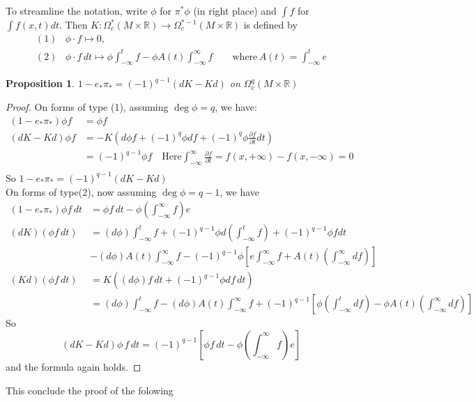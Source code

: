\documentclass{article}
\newtheorem{proposition}{Proposition}[section]
\begin{document}
\qquad To streamline the notation, write  $ \phi $ for  $ \pi^*\phi $ (in right place) and  $ \int f  $ for  $ \int f(x,t)dt $. Then  $ K:\Omega_c^*(M\times \mathbb{R })\rightarrow \Omega_c^{*-1}(M\times \mathbb{R })  $ is defined by
\begin{align*}
    (1)&\phi\cdot f\mapsto 0,\\
    (2)&\phi\cdot f\, dt\mapsto\phi \int_{-\infty}^{t}f-\phi A(t)\int_{-\infty}^{\infty}f\qquad \text{where}\, A(t)=\int_{-\infty}^{t }e
\end{align*}   
\setcounter{proposition}{5}
\begin{proposition}
     $ 1-e_*\pi_*=(-1)^{q-1}(dK-Kd) $ on  $ \Omega_c^q(M\times \mathbb{R }) $  
\end{proposition}
\begin{proof}
    On forms of type (1), assuming  $ \deg \phi =q $, we have:
    \begin{align*}
        (1-e_*\pi_*)\phi f&=\phi f\\
        (dK-Kd)\phi f&=-K(d\phi f+(-1)^q\phi df+(-1)^q\phi \frac{\partial f }{\partial t }dt)\\
        &=(-1)^{q-1}\phi f\quad\text{Here} \int_{-\infty}^{\infty}\frac{\partial f }{\partial t }=f(x,+\infty)-f(x,-\infty)=0\\
    \end{align*}  
    So  $ 1-e_*\pi_*=(-1)^{q-1}(dK-Kd) $\\
    \qquad On forms of type(2), now assuming  $ \deg\phi =q-1 $, we have
    \begin{align*}
        (1-e_*\pi_*)\phi f\, dt&=\phi f \,dt-\phi(\int_{-\infty}^{\infty}f)e\\
        (dK)(\phi f\, dt)&=(d\phi)\int_{-\infty}^{t }f+(-1)^{q-1}\phi d(\int_{-\infty}^{t}f)+(-1)^{q-1}\phi f dt\\
        &-(d\phi)A(t)\int_{-\infty}^{\infty}f-(-1)^{q-1}\phi\left[e\int_{-\infty}^{\infty}f+A(t)(\int_{-\infty}^{\infty}df)\right]\\
        (Kd)(\phi f\, dt)&=K((d\phi)f \,dt  +(-1)^{q-1}\phi df \,dt)\\
        &=(d\phi)\int_{-\infty}^{t }f-(d\phi )A(t)\int_{-\infty}^{\infty}f +(-1)^{q-1}\left[\phi (\int_{-\infty}^{t }df)-\phi A(t)(\int_{-\infty}^{\infty}df)\right]
    \end{align*} 
    So\[(dK-Kd)\phi \, f\,dt =(-1)^{q-1}[\phi f \,dt -\phi (\int_{-\infty}^{\infty}f )e]\]
    and the formula again holds.
\end{proof}
This conclude the proof of the folowing
\end{document}
